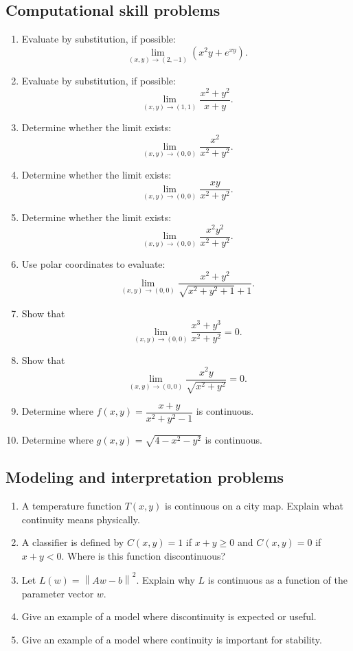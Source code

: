 \documentclass[11pt]{article}
\newcommand{\norm}[1]{\left\lVert #1\right\rVert}
\begin{document}
\subsection*{Computational skill problems}
\begin{enumerate}[resume]
  \item Evaluate by substitution, if possible:
  \[
  \lim_{(x,y)\to(2,-1)} (x^2y+e^{xy}).
  \]
  \item Evaluate by substitution, if possible:
  \[
  \lim_{(x,y)\to(1,1)} \frac{x^2+y^2}{x+y}.
  \]
  \item Determine whether the limit exists:
  \[
  \lim_{(x,y)\to(0,0)} \frac{x^2}{x^2+y^2}.
  \]
  \item Determine whether the limit exists:
  \[
  \lim_{(x,y)\to(0,0)} \frac{xy}{x^2+y^2}.
  \]
  \item Determine whether the limit exists:
  \[
  \lim_{(x,y)\to(0,0)} \frac{x^2y^2}{x^2+y^2}.
  \]
  \item Use polar coordinates to evaluate:
  \[
  \lim_{(x,y)\to(0,0)} \frac{x^2+y^2}{\sqrt{x^2+y^2+1}+1}.
  \]
  \item Show that
  \[
  \lim_{(x,y)\to(0,0)} \frac{x^3+y^3}{x^2+y^2}=0.
  \]
  \item Show that
  \[
  \lim_{(x,y)\to(0,0)} \frac{x^2y}{\sqrt{x^2+y^2}}=0.
  \]
  \item Determine where $f(x,y)=\dfrac{x+y}{x^2+y^2-1}$ is continuous.
  \item Determine where $g(x,y)=\sqrt{4-x^2-y^2}$ is continuous.
\end{enumerate}

\subsection*{Modeling and interpretation problems}
\begin{enumerate}[resume]
  \item A temperature function $T(x,y)$ is continuous on a city map. Explain what continuity means physically.
  \item A classifier is defined by $C(x,y)=1$ if $x+y\ge0$ and $C(x,y)=0$ if $x+y<0$. Where is this function discontinuous?
  \item Let $L(w)=\norm{Aw-b}^2$. Explain why $L$ is continuous as a function of the parameter vector $w$.
  \item Give an example of a model where discontinuity is expected or useful.
  \item Give an example of a model where continuity is important for stability.
\end{enumerate}
\end{document}
